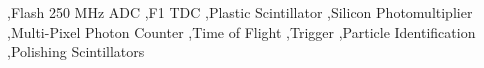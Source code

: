 \begin{keyword}
\gx{} \sep Flash 250 MHz ADC \sep F1 TDC \sep Plastic Scintillator \sep Silicon Photomultiplier \sep Multi-Pixel Photon Counter \sep Time of Flight \sep Trigger \sep Particle Identification \sep Polishing Scintillators
\end{keyword}